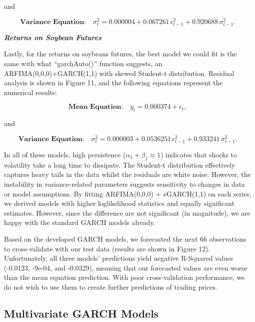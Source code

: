 \documentclass[11pt]{article}
\begin{document}
and

\begin{equation}
\textbf{Variance Equation:} \quad \sigma_{t}^{2} = 0.000004 + 0.067261\,\epsilon_{t-1}^{2} + 0.920688\,\sigma_{t-1}^{2}.
\end{equation}

\textbf{\emph{Returns on Soybean Futures}}

Lastly, for the returns on soybeans futures, the best model we could fit is the same with what ``garchAuto()'' function suggests, an ARFIMA(0,0,0)+GARCH(1,1) with skewed Student-t distribution. Residual analysis is shown in Figure 11, and the following equations represent the numerical results:

\begin{equation}
\textbf{Mean Equation:} \quad y_{t} = 0.000374 + \epsilon_{t},
\end{equation}

and

\begin{equation}
\textbf{Variance Equation:} \quad \sigma_{t}^{2} = 0.000003 + 0.0536251\,\epsilon_{t-1}^{2} + 0.933241\,\sigma_{t-1}^{2}.
\end{equation}

In all of these models, high persistence ($\alpha_1+\beta_1\approx 1$) indicates that shocks to volatility take a long time to dissipate. The Student-t distribution effectively captures heavy tails in the data whilst the residuals are white noise. However, the instability in variance-related parameters suggests sensitivity to changes in data or model assumptions. By fitting ARFIMA(0,0,0) + eGARCH(1,1) on each series, we derived models with higher loglikelihood statistics and equally significant estimates. However, since the difference are not significant (in magnitude), we are happy with the standard GARCH models already.

Based on the developed GARCH models, we forecasted the next 66 observations to cross-validate with our test data (results are shown in Figure 12). Unfortunately, all three models' predictions yield negative R-Squared values (-0.0123, -9e-04, and -0.0329), meaning that our forecasted values are even worse than the mean equation prediction. With poor cross-validation performance, we do not wish to use them to create further predictions of trading prices.

\subsection{Multivariate GARCH Models}
\end{document}
